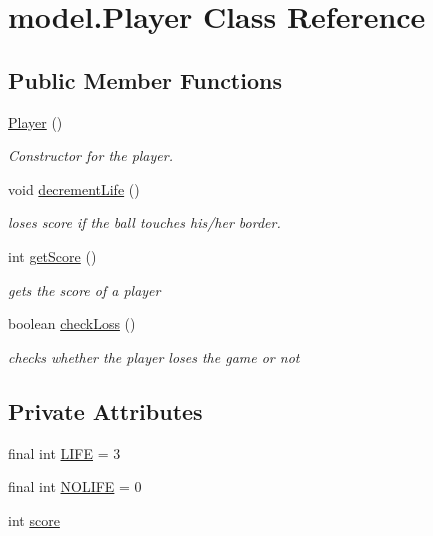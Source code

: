 \hypertarget{classmodel_1_1_player}{}\section{model.\+Player Class Reference}
\label{classmodel_1_1_player}
\subsection*{Public Member Functions}
\begin{DoxyCompactItemize}
\item 
\hyperlink{classmodel_1_1_player_a6922d8b0b084510c84540a3497504ed3}{Player} ()
\begin{DoxyCompactList}\small\item\em Constructor for the player. \end{DoxyCompactList}\item 
void \hyperlink{classmodel_1_1_player_a5551dad23bcab60638b37c8f54dd6796}{decrement\+Life} ()
\begin{DoxyCompactList}\small\item\em loses score if the ball touches his/her border. \end{DoxyCompactList}\item 
int \hyperlink{classmodel_1_1_player_a9e027a7ee08d451cde3e6743e2ef1d6d}{get\+Score} ()
\begin{DoxyCompactList}\small\item\em gets the score of a player \end{DoxyCompactList}\item 
boolean \hyperlink{classmodel_1_1_player_a1027595469ab5de940ba2f6cbb29e5ef}{check\+Loss} ()
\begin{DoxyCompactList}\small\item\em checks whether the player loses the game or not \end{DoxyCompactList}\end{DoxyCompactItemize}
\subsection*{Private Attributes}
\begin{DoxyCompactItemize}
\item 
final int \hyperlink{classmodel_1_1_player_a59153913ee338710aa1a33b68e5d0dbd}{L\+I\+FE} = 3
\item 
final int \hyperlink{classmodel_1_1_player_ad422bd3896f6c86c74fe49be0cae6759}{N\+O\+L\+I\+FE} = 0
\item 
int \hyperlink{classmodel_1_1_player_ad6d852aea99befddd30bb094222123d2}{score}
\end{DoxyCompactItemize}


